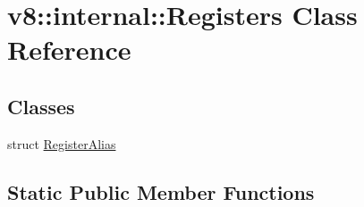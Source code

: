 \hypertarget{classv8_1_1internal_1_1Registers}{}\section{v8\+:\+:internal\+:\+:Registers Class Reference}
\label{classv8_1_1internal_1_1Registers}
\subsection*{Classes}
\begin{DoxyCompactItemize}
\item 
struct \mbox{\hyperlink{structv8_1_1internal_1_1Registers_1_1RegisterAlias}{Register\+Alias}}
\end{DoxyCompactItemize}
\subsection*{Static Public Member Functions}
